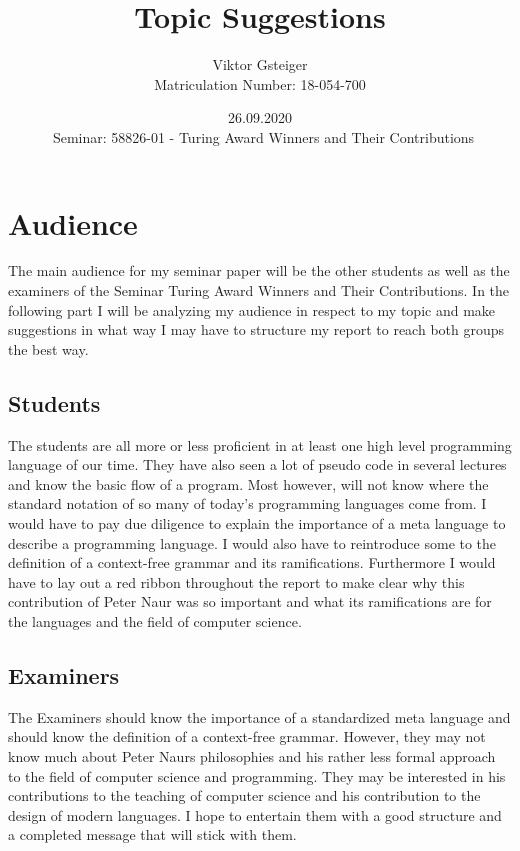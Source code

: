 \documentclass{article}
\author{Viktor Gsteiger \\ Matriculation Number: 18-054-700}
\title{Topic Suggestions}
\date{26.09.2020 \\\ Seminar: 58826-01 - Turing Award Winners and Their Contributions}
\begin{document}
\maketitle

\tableofcontents

\section{Audience}

The main audience for my seminar paper will be the other students as well as the examiners of the Seminar Turing Award Winners and Their Contributions. In the following part I will be analyzing my audience in respect to my topic and make suggestions in what way I may have to structure my report to reach both groups the best way.

\subsection{Students}

The students are all more or less proficient in at least one high level programming language of our time. They have also seen a lot of pseudo code in several lectures and know the basic flow of a program. Most however, will not know where the standard notation of so many of today's programming languages come from. I would have to pay due diligence to explain the importance of a meta language to describe a programming language. I would also have to reintroduce some to the definition of a context-free grammar and its ramifications. Furthermore I would have to lay out a red ribbon throughout the report to make clear why this contribution of Peter Naur was so important and what its ramifications are for the languages and the field of computer science. 

\subsection{Examiners}

The Examiners should know the importance of a standardized meta language and should know the definition of a context-free grammar. However, they may not know much about Peter Naurs philosophies and his rather less formal approach to the field of computer science and programming. They may be interested in his contributions to the teaching of computer science and his contribution to the design of modern languages. I hope to entertain them with a good structure and a completed message that will stick with them. 
\end{document}

